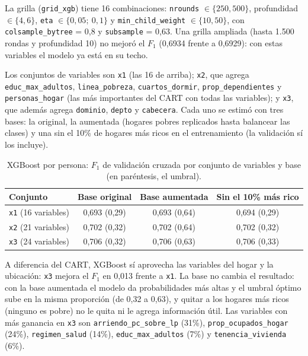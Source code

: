 \documentclass[12pt]{article}
\begin{document}
La grilla (\texttt{grid\_xgb}) tiene 16 combinaciones: \texttt{nrounds}
$\in\{250, 500\}$, profundidad $\in\{4, 6\}$, \texttt{eta}
$\in\{0{,}05;\ 0{,}1\}$ y \texttt{min\_child\_weight} $\in\{10, 50\}$,
con \texttt{colsample\_bytree} = 0,8 y \texttt{subsample} = 0,63. Una
grilla ampliada (hasta 1.500 rondas y profundidad 10) no mejoró el $F_1$
(0,6934 frente a 0,6929): con estas variables el modelo ya está en su techo.

Los conjuntos de variables son \texttt{x1} (las 16 de arriba); \texttt{x2},
que agrega \texttt{educ\_max\_adultos}, \texttt{linea\_pobreza},
\texttt{cuartos\_dormir}, \texttt{prop\_dependientes} y
\texttt{personas\_hogar} (las más importantes del CART con todas las
variables); y \texttt{x3}, que además agrega \texttt{dominio},
\texttt{depto} y \texttt{cabecera}. Cada uno se estimó con tres bases: la
original, la aumentada (hogares pobres replicados hasta balancear las clases)
y una sin el 10\% de hogares más ricos en el entrenamiento (la validación
sí los incluye).

\begin{table}[H]
  \centering
  \small
  \caption{XGBoost por persona: $F_1$ de validación cruzada por conjunto de
    variables y base (en paréntesis, el umbral).}
  \label{tab:xgboost}
  \begin{tabular}{@{}lccc@{}}
    \toprule
    Conjunto & Base original & Base aumentada & Sin el 10\% más rico \\
    \midrule
    \texttt{x1} (16 variables) & 0,693 (0,29) & 0,693 (0,64) & 0,694 (0,29) \\
    \texttt{x2} (21 variables) & 0,702 (0,32) & 0,702 (0,64) & 0,702 (0,32) \\
    \texttt{x3} (24 variables) & 0,706 (0,32) & 0,706 (0,63) & 0,706 (0,33) \\
    \bottomrule
  \end{tabular}
\end{table}

A diferencia del CART, XGBoost sí aprovecha las variables del hogar y la
ubicación: \texttt{x3} mejora el $F_1$ en 0,013 frente a \texttt{x1}. La
base no cambia el resultado: con la base aumentada el modelo da
probabilidades más altas y el umbral óptimo sube en la misma proporción (de
0,32 a 0,63), y quitar a los hogares más ricos (ninguno es pobre) no le quita
ni le agrega información útil. Las variables con más ganancia en
\texttt{x3} son \texttt{arriendo\_pc\_sobre\_lp} (31\%),
\texttt{prop\_ocupados\_hogar} (24\%), \texttt{regimen\_salud} (14\%),
\texttt{educ\_max\_adultos} (7\%) y \texttt{tenencia\_vivienda} (6\%).
\end{document}

